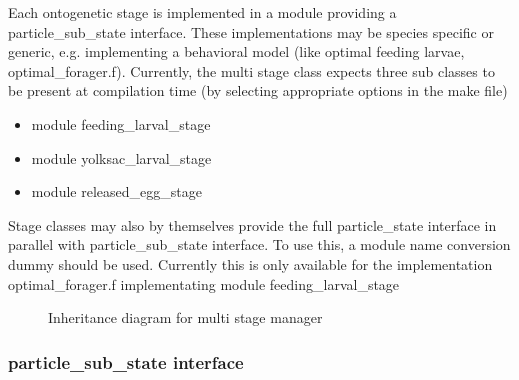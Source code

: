   Each ontogenetic stage is implemented in a module providing a particle\_sub\_state interface.
  These implementations may be species specific or generic, e.g. implementing a behavioral model 
 (like optimal feeding larvae, optimal\_forager.f).
  Currently, the multi stage class expects three sub classes to be present at compilation time
  (by selecting appropriate options in the make file)

  \begin{itemize}
  \item module feeding\_larval\_stage   
  \item module yolksac\_larval\_stage                    
  \item module released\_egg\_stage 
  \end{itemize}

  Stage classes may also by themselves provide the full particle\_state interface in parallel
  with particle\_sub\_state interface. To use this, a module name conversion dummy should
  be used. Currently this is only available for the implementation optimal\_forager.f 
  implementating module feeding\_larval\_stage   


\begin{figure}[p]   %
\begin{center}                                                 
\end{center}                                                    
\caption{Inheritance diagram for multi stage manager}
\label{multistagemanager:fig}
\end{figure}


\subsubsection{particle\_sub\_state interface} 

